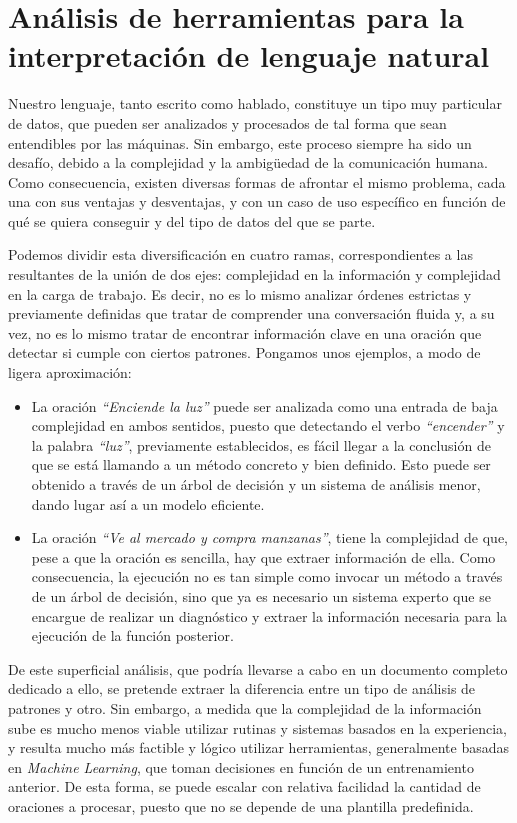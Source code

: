 \documentclass[11pt,spanish,listoffigures]{tfgetsinf}
\begin{document}
\section{Análisis de herramientas para la interpretación de lenguaje natural}
\label{sec:analisis-herramientas-interpretacion-lenguaje-natural}

Nuestro lenguaje, tanto escrito como hablado, constituye un tipo muy particular de datos, que pueden ser analizados y procesados de tal forma que sean entendibles por las máquinas. Sin embargo, este proceso siempre ha sido un desafío, debido a la complejidad y la ambigüedad de la comunicación humana. Como consecuencia, existen diversas formas de afrontar el mismo problema, cada una con sus ventajas y desventajas, y con un caso de uso específico en función de qué se quiera conseguir y del tipo de datos del que se parte.

Podemos dividir esta diversificación en cuatro ramas, correspondientes a las resultantes de la unión de dos ejes: complejidad en la información y complejidad en la carga de trabajo. Es decir, no es lo mismo analizar órdenes estrictas y previamente definidas que tratar de comprender una conversación fluida y, a su vez, no es lo mismo tratar de encontrar información clave en una oración 	que detectar si cumple con ciertos patrones. Pongamos unos ejemplos, a modo de ligera aproximación:

\begin{itemize}
    \item La oración \textit{“Enciende la luz”} puede ser analizada como una entrada de baja complejidad en ambos sentidos, puesto que detectando el verbo \textit{“encender”} y la palabra \textit{“luz”}, previamente establecidos, es fácil llegar a la conclusión de que se está llamando a un método concreto y bien definido. Esto puede ser obtenido a través de un árbol de decisión y un sistema de análisis menor, dando lugar así a un modelo eficiente.
    \item La oración \textit{“Ve al mercado y compra manzanas”}, tiene la complejidad de que, pese a que la oración es sencilla, hay que extraer información de ella. Como consecuencia, la ejecución no es tan simple como invocar un método a través de un árbol de decisión, sino que ya es necesario un sistema experto que se encargue de realizar un diagnóstico y extraer la información necesaria para la ejecución de la función posterior.
\end{itemize}

De este superficial análisis, que podría llevarse a cabo en un documento completo dedicado a ello, se pretende extraer la diferencia entre un tipo de análisis de patrones y otro. Sin embargo, a medida que la complejidad de la información sube es mucho menos viable utilizar rutinas y sistemas basados en la experiencia, y resulta mucho más factible y lógico utilizar herramientas, generalmente basadas en \textit{Machine Learning}, que toman decisiones en función de un entrenamiento anterior. De esta forma, se puede escalar con relativa facilidad la cantidad de oraciones a procesar, puesto que no se depende de una plantilla predefinida.
\end{document}
